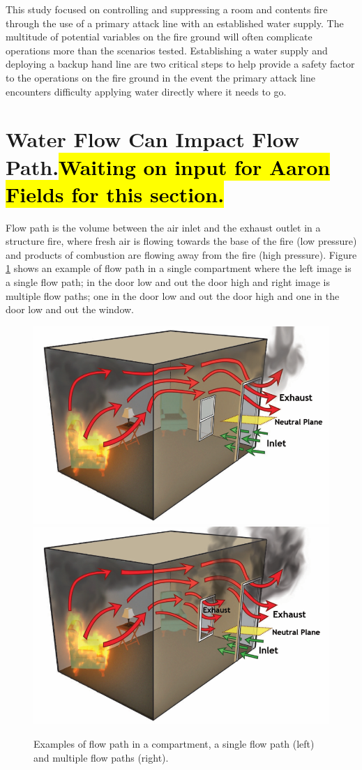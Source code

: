 \documentclass[12pt,oneside]{book}
\begin{document}
This study focused on controlling and suppressing a room and contents fire through the use of a primary attack line with an established water supply. The multitude of potential variables on the fire ground will often complicate operations more than the scenarios tested. Establishing a water supply and deploying a backup hand line are two critical steps to help provide a safety factor to the operations on the fire ground in the event the primary attack line encounters difficulty applying water directly where it needs to go.  

\section{Water Flow Can Impact Flow Path.\hl{Waiting on input for Aaron Fields for this section.}} \label{tc:water_impact_flowpath}
Flow path is the volume between the air inlet and the exhaust outlet in a structure fire, where fresh air is flowing towards the base of the fire (low pressure) and products of combustion are flowing away from the fire (high pressure). Figure \ref{fig:flow_path_effect_TC_flow_path} shows an example of flow path in a single compartment where the left image is a single flow path; in the door low and out the door high and right image is multiple flow paths; one in the door low and out the door high and one in the door low and out the window. 

\begin{figure}[H]
\centering
\includegraphics[width=.48\textwidth]{../0_Images/Tactical_Considerations/Flow_Path_Effect/flow_path.png}
\includegraphics[width=.48\textwidth]{../0_Images/Tactical_Considerations/Flow_Path_Effect/two_flow_path.png}
\caption[Flow Path]{Examples of flow path in a compartment, a single flow path (left) and multiple flow paths (right).}
\label{fig:flow_path_effect_TC_flow_path}
\end{figure}
\end{document}
